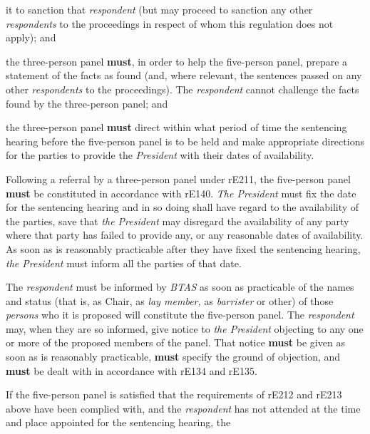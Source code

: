 it to sanction that \emph{respondent} (but may proceed to sanction any
other \emph{respondents} to the proceedings in respect of whom this
regulation does not apply); and\item the three-person panel  \textcolor{myred}{\textbf{must}}, in order to help the five-person panel,
prepare a statement of the facts as found (and, where relevant, the
sentences passed on any other \emph{respondents} to the proceedings).
The \emph{respondent} cannot challenge the facts found by the
three-person panel; and\item the three-person panel  \textcolor{myred}{\textbf{must}} direct within what period of time the
sentencing hearing before the five-person panel is to be held and make
appropriate directions for the parties to provide
the \emph{President }with their dates of availability.\ln
{}\par
Following a referral by a three-person panel under rE211, the
five-person panel  \textcolor{myred}{\textbf{must}} be constituted in accordance with
rE140. \emph{The President }must fix the date for the sentencing hearing
and in so doing shall have regard to the availability of the parties,
save that \emph{the President }may disregard the availability of any
party where that party has failed to provide any, or any reasonable
dates of availability. As soon as is reasonably practicable after they
have fixed the sentencing hearing, \emph{the President }must inform all
the parties of that date.\\
\par
The \emph{respondent }must be informed by \emph{BTAS }as soon as
practicable of the names and status (that is, as Chair, as \emph{lay
member, }as \emph{barrister }or other) of those \emph{persons }who it is
proposed will constitute the five-person\emph{ }panel.
The \emph{respondent }may, when they are so informed, give notice
to \emph{the President }objecting to any one or more of the proposed
members of the panel. That notice  \textcolor{myred}{\textbf{must}} be given as soon as is reasonably
practicable,  \textcolor{myred}{\textbf{must}} specify the ground of objection, and  \textcolor{myred}{\textbf{must}} be dealt
with in accordance with rE134 and rE135.\\
\par
If the five-person panel is satisfied that the requirements of rE212 and
rE213 above have been complied with, and the \emph{respondent} has not
attended at the time and place appointed for the sentencing hearing, the

